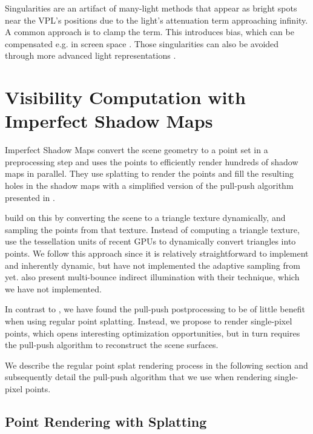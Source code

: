 Singularities are an artifact of many-light methods that appear as bright spots near the VPL's positions due to the light's attenuation term approaching infinity. A common approach is to clamp the term. This introduces bias, which can be compensated e.g. in screen space \cite{novak2011screen}. Those singularities can also be avoided through more advanced light representations \cite{tokuyoshi2015vsgl}.



\section{Visibility Computation with \\ Imperfect Shadow Maps}
\label{sec:concept:ism}

Imperfect Shadow Maps \cite{ritschel2008ism} convert the scene geometry to a point set in a preprocessing step and uses the points to efficiently render hundreds of shadow maps in parallel. They use splatting to render the points and fill the resulting holes in the shadow maps with a simplified version of the pull-push algorithm presented in \cite{Marroquim:2007:reconstruction}.

\cite{ritschel2011ismsViewAdaptive} build on this by converting the scene to a triangle texture dynamically, and sampling the points from that texture. Instead of computing a triangle texture, \cite{barak2013temporally} use the tessellation units of recent GPUs to dynamically convert triangles into points.
We follow this approach since it is relatively straightforward to implement and inherently dynamic, but have not implemented the adaptive sampling from \cite{ritschel2011ismsViewAdaptive} yet.
\cite{ritschel2008ism} also present multi-bounce indirect illumination with their technique, which we have not implemented.

In contrast to \cite{ritschel2008ism}, we have found the pull-push postprocessing to be of little benefit when using regular point splatting. Instead, we propose to render single-pixel points, which opens interesting optimization opportunities, but in turn requires the pull-push algorithm to reconstruct the scene surfaces.

We describe the regular point splat rendering process in the following section and subsequently detail the pull-push algorithm that we use when rendering single-pixel points.


\subsection{Point Rendering with Splatting}

